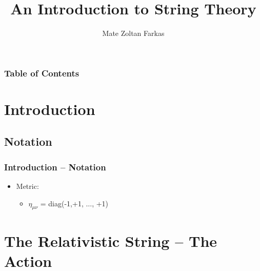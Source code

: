 \documentclass[aspectratio=169]{beamer}
\begin{document}
	
	\author{Mate Zoltan Farkas}
	\title{An Introduction to String Theory}
	
	\begin{frame}[plain]
		\maketitle
	\end{frame}
	
	\begin{frame}
		\frametitle{Table of Contents}
		\tableofcontents
	\end{frame}

	\section{Introduction}
	\subsection{Notation}
	
	\begin{frame}
		\frametitle{Introduction -- Notation}
		\begin{itemize}
			\item Metric:
			\begin{itemize}
				\item $\eta_{\mu\nu}$ = diag(-1,+1, $\dots$, +1)
			\end{itemize}
		\end{itemize}
	\end{frame}

	\section{The Relativistic String -- The Action}
	
\end{document}
